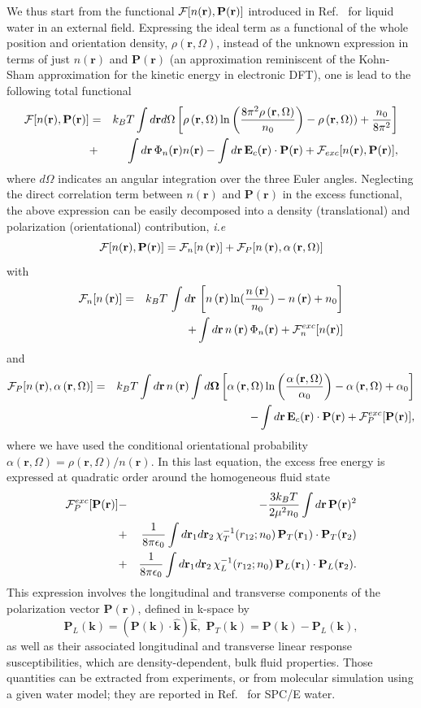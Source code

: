 \documentclass[aip,jcp,preprint]{revtex4-1}
\newcommand{\be}{\begin{equation}}
\newcommand{\ee}{\end{equation}}
\newcommand{\bea}{\begin{eqnarray}}
\newcommand{\eea}{\end{eqnarray}}
\newcommand{\nn}{\nonumber}
\newcommand{\RR}{\mathbf{r}}
\newcommand{\rr}{\mathbf{r}}
\newcommand{\dr}{d\mathbf{r}}
\newcommand{\kk}{\mathbf{k}}
\newcommand{\rhon}{{n\left({\mathbf r}\right)}}
\newcommand{\rhorom}{{\rho\left({\mathbf r},\Omega\right)}}
\newcommand{\alpharom}{{\alpha\left({\mathbf r},\Omega\right)}}
\newcommand{\Om}{\mathbf{\Omega}}
\newcommand{\nr}{n(\mathbf{r})}
\newcommand{\F}{{\cal F}}
\newcommand{\Pol}{\mathbf{P}({\mathbf r})}
\newcommand{\PP}{\mathbf{P}}
\newcommand{\EE}{\mathbf{E}}
\begin{document}
We thus start from the functional  $\F[n(\rr),\Pol]$ introduced in Ref.~\cite{jeanmairet13} for liquid water in an external field.  Expressing the ideal term as a functional of the whole position and orientation density, $\rho(\rr,\Omega)$, instead of the unknown expression in terms of just $n(\rr)$ and  $\PP(\rr)$ (an approximation reminiscent of the Kohn-Sham approximation for the kinetic energy in electronic DFT),  one is lead to the following total functional 
\bea
\label{eq:Ftot}
\F[n(\rr),\PP(\rr)] &=& k_BT \int d\rr d\Omega \left[ \rhorom \ln \left(\frac{8\pi^2 \rhorom}{n_0} \right) - \rhorom)+\frac{n_0}{8\pi^2} \right] \nn \\
& + &   \int \dr \, \Phi_n(\rr) n(\rr) - \int \dr \, \EE_c(\rr) \cdot \PP(\rr) + \F_{exc}[n(\rr),\PP(\rr)],
\eea
where $d\Omega$ indicates an angular integration over the three Euler angles. Neglecting the direct correlation term between $\nr$ and $\Pol$ in the excess functional, the above expression can be easily decomposed into a density (translational) and polarization (orientational) contribution, {\em i.e}
\be
  \F[n(\rr),\PP(\rr)] = \F_n[\rhon] + \F_P[\rhon,\alpharom]
  \label{eq:Fn+FP}
\ee
with
\bea
\F_n[\rhon] &= &k_BT \,\int d\RR \,  \left[ \rhon \ln(\frac{\rhon}{n_0})-\rhon+n_0 \right]  \nn \\
& & + \int d\rr\, \rhon \,  \Phi_n(\rr) + \F_n^{exc}[n(\rr)]   \label{eq:Fn}
\eea
and
\bea
\F_P[\rhon,\alpharom] &=& k_BT \int d\rr  \, \rhon \int d\Om \left[ \alpharom \ln \left(\frac{\alpharom}{\alpha_0} \right)  - \alpharom + \alpha_0 \right] \nn \\
& &  - \int \dr \, \EE_c(\rr) \cdot \PP(\rr) + \F_P^{exc}[\Pol], 
\label{eq:FP}
\eea
where we have used  the conditional orientational probability $\alpharom = \rhorom/\rhon$. In this last equation, the excess free energy is expressed at quadratic order around the homogeneous fluid state
\bea
\F_P^{exc}[\Pol] &- & -  \frac{3k_BT}{2\mu^2 n_0}  \int d\rr \, \Pol^2\nn \\
&+&      \frac{1}{8\pi \epsilon_0} \int d\rr_1 d\rr_2 \, \chi_T^{-1}(r_{12};n_0) \, \PP_T(\rr_1) \cdot \PP_T(\rr_2)  \nn \\
&+&    \frac{1}{8\pi \epsilon_0} \int d\rr_1 d\rr_2 \, \chi_L^{-1}(r_{12};n_0) \, \PP_L(\rr_1) \cdot \PP_L(\rr_2).  
\label{eq:FP_exc}
\eea
This expression involves the longitudinal and transverse components of the polarization vector $\Pol$, defined in k-space by
\be
\PP_L(\kk) = (\PP(\kk) \cdot \hat{\kk})  \hat{\kk}, \,  \, \PP_T(\kk) = \PP(\kk) - \PP_L(\kk),
\label{eq:P_L_T}
\ee
as well as their associated longitudinal and transverse linear response susceptibilities, which are density-dependent, bulk fluid properties. Those quantities can be extracted from experiments, or from molecular simulation using a given water model; they are reported in 
Ref.~\cite{jeanmairet13} for SPC/E water.
\end{document}
